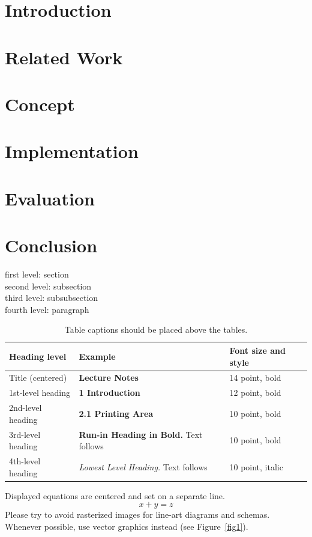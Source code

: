 \section{Introduction}
\section{Related Work}

\section{Concept}
\section{Implementation}
\section{Evaluation}
\section{Conclusion}




first level: section\\
second level: subsection\\
third level: subsubsection\\
fourth level: paragraph

\begin{table}[tbh!]
\caption{Table captions should be placed above the
tables.}\label{tab1}
\begin{tabular}{lll}
\hline
Heading level &  Example & Font size and style\\
\hline
Title (centered) &  {\Large\bfseries Lecture Notes} & 14 point, bold\\
1st-level heading &  {\large\bfseries 1 Introduction} & 12 point, bold\\
2nd-level heading & {\bfseries 2.1 Printing Area} & 10 point, bold\\
3rd-level heading & {\bfseries Run-in Heading in Bold.} Text follows & 10 point, bold\\
4th-level heading & {\itshape Lowest Level Heading.} Text follows & 10 point, italic\\
\hline
\end{tabular}
\end{table}
Displayed equations are centered and set on a separate line.
\begin{equation}
x + y = z
\end{equation}
Please try to avoid rasterized images for line-art diagrams and
schemas. Whenever possible, use vector graphics instead (see
Figure~\ref{fig1}).

